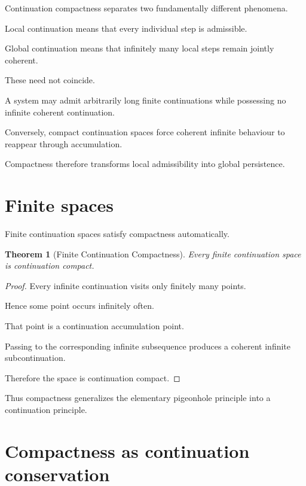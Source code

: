 \documentclass[13pt,openany]{book}
\theoremstyle{plain}
\newtheorem{theorem}{Theorem}[chapter]
\theoremstyle{definition}
\begin{document}
Continuation compactness separates two fundamentally different phenomena.

Local continuation means that every individual step is admissible.

Global continuation means that infinitely many local steps remain jointly
coherent.

These need not coincide.

A system may admit arbitrarily long finite continuations while possessing no
infinite coherent continuation.

Conversely, compact continuation spaces force coherent infinite behaviour to
reappear through accumulation.

Compactness therefore transforms local admissibility into global persistence.

\section{Finite spaces}

Finite continuation spaces satisfy compactness automatically.

\begin{theorem}[Finite Continuation Compactness]
Every finite continuation space is continuation compact.
\end{theorem}

\begin{proof}
Every infinite continuation visits only finitely many points.

Hence some point occurs infinitely often.

That point is a continuation accumulation point.

Passing to the corresponding infinite subsequence produces a coherent infinite
subcontinuation.

Therefore the space is continuation compact.
\end{proof}

Thus compactness generalizes the elementary pigeonhole principle into a
continuation principle.

\section{Compactness as continuation conservation}
\end{document}
